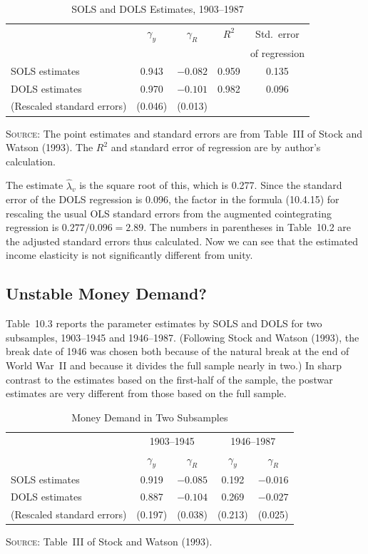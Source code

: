 \begin{table}[htbp]
\centering
\caption{SOLS and DOLS Estimates, 1903--1987}
\label{tab:10.2}
\begin{tabular}{l cccc}
\toprule
 & $\gamma_y$ & $\gamma_R$ & $R^2$ & Std.\ error \\
 & & & & of regression \\
\midrule
SOLS estimates & 0.943 & $-0.082$ & 0.959 & 0.135 \\[3pt]
DOLS estimates & 0.970 & $-0.101$ & 0.982 & 0.096 \\
(Rescaled standard errors) & (0.046) & (0.013) & & \\
\bottomrule
\end{tabular}

\medskip
\small
\textsc{Source:} The point estimates and standard errors are from Table~III of Stock
and Watson (1993). The $R^2$ and standard error of regression are by author's
calculation.
\end{table}

The estimate $\hat{\lambda}_v$ is the square root of this, which is 0.277. Since the standard error
of the DOLS regression is 0.096, the factor in the formula (10.4.15) for rescal\-ing
the usual OLS standard errors from the augmented cointegrating regression is
$0.277/0.096 = 2.89$. The numbers in parentheses in Table~10.2 are the adjusted
standard errors thus calculated. Now we can see that the estimated income elastic\-ity
is not significantly different from unity.

\subsection*{Unstable Money Demand?}

Table~10.3 reports the parameter estimates by SOLS and DOLS for two subsam\-ples,
1903--1945 and 1946--1987. (Following Stock and Watson (1993), the break
date of 1946 was chosen both because of the natural break at the end of World
War~II and because it divides the full sample nearly in two.) In sharp contrast to
the estimates based on the first-half of the sample, the postwar estimates are very
different from those based on the full sample.

\begin{table}[htbp]
\centering
\caption{Money Demand in Two Subsamples}
\label{tab:10.3}
\begin{tabular}{l cccc}
\toprule
 & \multicolumn{2}{c}{1903--1945} & \multicolumn{2}{c}{1946--1987} \\
 & $\gamma_y$ & $\gamma_R$ & $\gamma_y$ & $\gamma_R$ \\
\midrule
SOLS estimates & 0.919 & $-0.085$ & 0.192 & $-0.016$ \\[3pt]
DOLS estimates & 0.887 & $-0.104$ & 0.269 & $-0.027$ \\
(Rescaled standard errors) & (0.197) & (0.038) & (0.213) & (0.025) \\
\bottomrule
\end{tabular}

\medskip
\small
\textsc{Source:} Table~III of Stock and Watson (1993).
\end{table}

